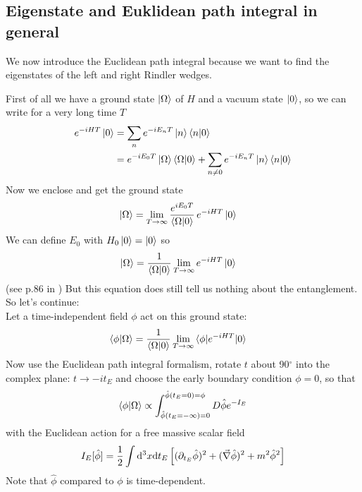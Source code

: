 \subsection{Eigenstate and Euklidean path integral in general \checkmark}
	We now introduce the Euclidean path integral because we want to find the eigenstates of the left and right Rindler wedges. 
	
	First of all we have a ground state $\ket{\Omega}$ of $H$ and a vacuum state $\ket{0}$, so we can write for a very long time $T$
	\begin{align*}
		e^{-iHT}\ket{0} &= \sum_n e^{-iE_n T} \ket{n}\braket{n|0} \\
		&= e^{-iE_0 T} \ket{\Omega} \braket{\Omega|0} 
		+ \sum_{n\neq 0} e^{-iE_n T} \ket{n} \braket{n|0}
	\end{align*}
	Now we enclose and get the ground state
	\begin{align*}
		\ket{\Omega} &= \lim\limits_{T \rightarrow \infty} \frac{e^{iE_0 T}}{\braket{\Omega|0}} \,e^{-iHT} \ket{0}
	\end{align*}
	We can define $E_0$ with $H_0\ket{0}=\ket{0}$ so
	\begin{align*}
		\ket{\Omega} &=  \frac{1}{\braket{\Omega|0}} \lim\limits_{T \rightarrow \infty} e^{-iHT} \ket{0}
	\end{align*}
	(see p.86 in \cite{PaS}) But this equation does still tell us nothing about the entanglement. So let's continue: \\
	Let a time-independent field $\phi$ %
	act on this ground state:
	\begin{align*} \label{groundstate_phi}
		\braket{\phi|\Omega} &= \frac{1}{\braket{\Omega|0}} \lim\limits_{T\rightarrow \infty} \braket{\phi|e^{-iHT}|0} 
	\end{align*}
	Now use the Euclidean path integral formalism, rotate $t$ about 90$^\circ$ into the complex plane: $t \rightarrow -i t_E$ and choose the early boundary condition $\phi=0$, so that
	\begin{align}
		\braket{\phi|\Omega} \propto \int_{\hat{\phi}(t_E = -\infty)= 0}^{\hat{\phi}(t_E = 0)=\phi} D\hat{\phi}e^{-I_E}
	\end{align}
	with the Euclidean action for a free massive scalar field
	\begin{align}
		I_E[\hat{\phi}] = \frac{1}{2} \int \mathrm{d}^3x \mathrm{d} t_E \left[
			(\partial_{t_E}\hat{\phi})^2 
			+ (\vec{\nabla}\hat{\phi})^2
			+ m^2\hat{\phi}^2
		\right]
	\end{align}
	Note that $\hat{\phi}$ compared to $\phi$ is time-dependent.